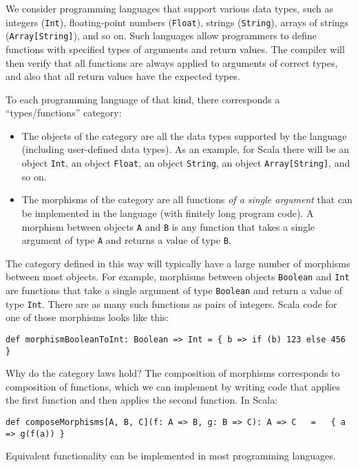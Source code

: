We consider programming languages that support various data types,
such as integers (\lstinline!Int!), floating-point numbers (\lstinline!Float!),
strings (\lstinline!String!), arrays of strings (\lstinline!Array[String]!),
and so on. Such languages allow programmers to define functions with
specified types of arguments and return values. The compiler will
then verify that all functions are always applied to arguments of
correct types, and also that all return values have the expected types. 

To each programming language of that kind, there corresponds a \textsf{``}types/functions\textsf{''}
category:
\begin{itemize}
\item The objects of the category are all the data types supported by the
language (including user-defined data types). As an example, for Scala
there will be an object \lstinline!Int!, an object \lstinline!Float!,
an object \lstinline!String!, an object \lstinline!Array[String]!,
and so on.
\item The morphisms of the category are all functions \emph{of a single
argument} that can be implemented in the language (with finitely long
program code). A morphism between objects \lstinline!A! and \lstinline!B!
is any function that takes a single argument of type \lstinline!A!
and returns a value of type \lstinline!B!.
\end{itemize}
The category defined in this way will typically have a large number
of morphisms between most objects. For example, morphisms between
objects \lstinline!Boolean! and \lstinline!Int! are functions that
take a single argument of type \lstinline!Boolean! and return a value
of type \lstinline!Int!. There are as many such functions as pairs
of integers. Scala code for one of those morphisms looks like this:
\begin{lstlisting}
def morphismBooleanToInt: Boolean => Int = { b => if (b) 123 else 456 }
\end{lstlisting}

Why do the category laws hold? The composition of morphisms corresponds
to composition of functions, which we can implement by writing code
that applies the first function and then applies the second function.
In Scala:
\begin{lstlisting}
def composeMorphisms[A, B, C](f: A => B, g: B => C): A => C   =   { a => g(f(a)) }
\end{lstlisting}
Equivalent functionality can be implemented in most programming languages.

